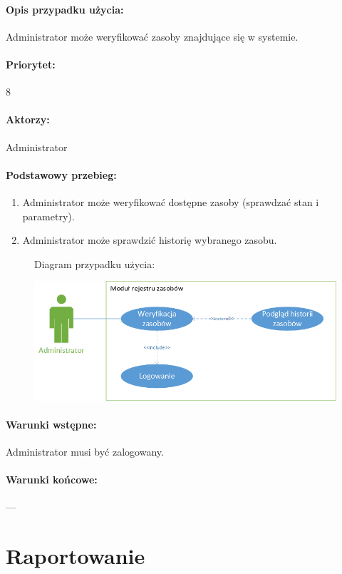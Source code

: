 \documentclass[11pt, a4paper, oneside]{report}
\begin{document}
\paragraph{Opis przypadku użycia:} Administrator może weryfikować zasoby znajdujące się w systemie.
\paragraph{Priorytet:} 8
\paragraph{Aktorzy:} Administrator
\paragraph{Podstawowy przebieg:}
\begin{enumerate}
\item Administrator może weryfikować dostępne zasoby (sprawdzać stan i parametry).
\item Administrator może sprawdzić historię wybranego zasobu.
\end{enumerate}

\begin{figure}[H]
Diagram przypadku użycia:

\centering
\includegraphics[scale=1]{weryfikacja_zasobow.png}
\end{figure}

\paragraph{Warunki wstępne:} Administrator musi być zalogowany.
\paragraph{Warunki końcowe:} ---

\section{Raportowanie}
\end{document}
